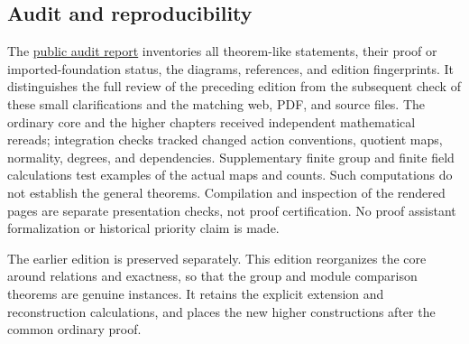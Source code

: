 \documentclass[11pt]{article}
\theoremstyle{definition}
\theoremstyle{remark}\newtheorem{remark}[theorem]{Remark}
\begin{document}
\subsection{Audit and reproducibility}

The \href{https://tensorgami.com/notes/quotients-and-reconstruction-audit.html}{public audit report}
inventories all theorem-like statements, their proof or imported-foundation
status, the diagrams, references, and edition fingerprints. It distinguishes
the full review of the preceding edition from the subsequent check of these
small clarifications and the matching web, PDF, and source files.
The ordinary core and the higher chapters received
independent mathematical rereads; integration checks tracked changed
action conventions, quotient maps, normality, degrees, and dependencies.
Supplementary finite group and finite field calculations test examples
of the actual maps and counts. Such computations do not establish the
general theorems. Compilation and inspection of the rendered pages are
separate presentation checks, not proof certification. No proof assistant
formalization or historical priority claim is made.

The earlier edition is preserved separately. This edition reorganizes
the core around relations and exactness, so that the group and module
comparison theorems are genuine instances. It retains the explicit
extension and reconstruction calculations, and places the new higher
constructions after the common ordinary proof.
\end{document}
